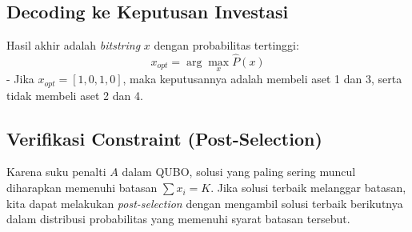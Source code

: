 \documentclass[12pt,a4paper]{article}
\begin{document}
\hypertarget{b.-decoding-ke-keputusan-investasi}{%
\subsection{Decoding ke Keputusan Investasi}\label{b.-decoding-ke-keputusan-investasi}}

Hasil akhir adalah \emph{bitstring} \(x\) dengan probabilitas tertinggi: \[ x_{opt} = \arg\max_x \hat{P}(x) \] - Jika \(x_{opt} = [1, 0, 1, 0]\), maka keputusannya adalah membeli aset 1 dan 3, serta tidak membeli aset 2 dan 4.

\hypertarget{c.-verifikasi-constraint-post-selection}{%
\subsection{Verifikasi Constraint (Post-Selection)}\label{c.-verifikasi-constraint-post-selection}}

Karena suku penalti \(A\) dalam QUBO, solusi yang paling sering muncul diharapkan memenuhi batasan \(\sum x_i = K\). Jika solusi terbaik melanggar batasan, kita dapat melakukan \emph{post-selection} dengan mengambil solusi terbaik berikutnya dalam distribusi probabilitas yang memenuhi syarat batasan tersebut.


\newpage
\appendix
\renewcommand{\thesection}{Appendix~\Alph{section}}
\renewcommand{\thesubsection}{\Alph{section}.\arabic{subsection}}
\renewcommand{\thesubsubsection}{\Alph{section}.\arabic{subsection}.\arabic{subsubsection}}


\newpage


\newpage


\newpage


\newpage


\newpage


\newpage


\newpage

\end{document}
